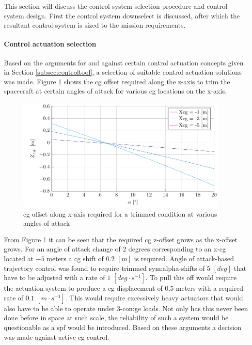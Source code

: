 This section will discuss the control system selection procedure and control system design. First the control system downselect is discussed, after which the resultant control system is sized to the mission requirements.

\paragraph{Control actuation selection}
Based on the arguments for and against certain control actuation concepts given in Section \ref{subsec:controltool}, a selection of suitable control actuation solutions was made. Figure \ref{fig:cgoffset} shows the \gls{cg} offset required along the z-axis to trim the spacecraft at certain angles of attack for various \gls{cg} locations on the x-axis. 
\begin{figure}[h]
	\centering
	\includegraphics[width=0.95\textwidth]{./Figure/control/moment}
	\caption[\acrlong{cg} offset along z-axis required for a trimmed condition at various angles of attack]{\gls{cg} offset along x-axis required for a trimmed condition at various angles of attack}
	\label{fig:cgoffset}
\end{figure}
From Figure \ref{fig:cgoffset} it can be seen that the required \gls{cg} z-offset grows as the x-offset grows. For an angle of attack change of $2$ degrees corresponding to an x-\gls{cg} located at $-5$ meters a \gls{cg} shift of $0.2$ $[m]$ is required. Angle of attack-based trajectory control was found to require trimmed \gls{sym:alpha}-shifts of $5$ $\left[deg\right]$ that have to be adjusted with a rate of $1$ $[deg \cdot s^{-1}]$. To pull this off would require the actuation system to produce a \gls{cg} displacement of $0.5$ meters with a required rate of $0.1$ $[m \cdot s^{-1}]$. This would require excessively heavy actuators that would also have to be able to operate under 3-\gls{con:ge} loads. Not only has this never been done before in space at such scale, the reliability of such a system would be questionable as a \gls{spf} would be introduced. Based on these arguments a decision was made against active \gls{cg} control.

